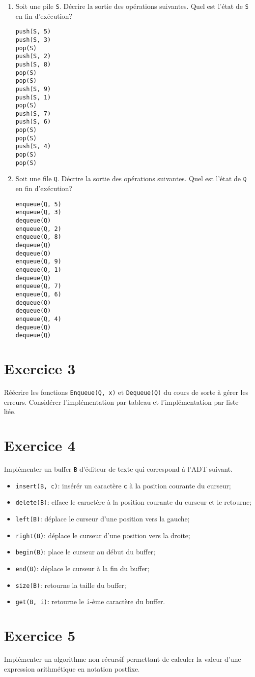 \documentclass[a4paper,10pt]{article}
\begin{document}
\begin{enumerate}
\item Soit une pile \texttt{S}. Décrire la sortie des opérations suivantes. Quel est l'état de \texttt{S} en fin d'exécution?

\begin{verbatim}
push(S, 5)
push(S, 3)
pop(S)
push(S, 2)
push(S, 8)
pop(S)
pop(S)
push(S, 9)
push(S, 1)
pop(S)
push(S, 7)
push(S, 6)
pop(S)
pop(S)
push(S, 4)
pop(S)
pop(S)
\end{verbatim}

\item Soit une file \texttt{Q}. Décrire la sortie des opérations suivantes. Quel est l'état de \texttt{Q} en fin d'exécution?

\begin{verbatim}
enqueue(Q, 5)
enqueue(Q, 3)
dequeue(Q)
enqueue(Q, 2)
enqueue(Q, 8)
dequeue(Q)
dequeue(Q)
enqueue(Q, 9)
enqueue(Q, 1)
dequeue(Q)
enqueue(Q, 7)
enqueue(Q, 6)
dequeue(Q)
dequeue(Q)
enqueue(Q, 4)
dequeue(Q)
dequeue(Q)
\end{verbatim}

\end{enumerate}

\section*{Exercice 3}

Réécrire les fonctions \texttt{Enqueue(Q, x)} et \texttt{Dequeue(Q)} du cours de sorte à gérer les erreurs. Considérer l'implémentation par tableau et l'implémentation par liste liée.

\section*{Exercice 4}

Implémenter un buffer \texttt{B} d'éditeur de texte qui correspond à l'ADT suivant.

\begin{itemize}
\item \texttt{insert(B, c)}: insérér un caractère \texttt{c} à la position courante du curseur;
\item \texttt{delete(B)}: efface le caractère à la position courante du curseur et le retourne;
\item \texttt{left(B)}: déplace le curseur d'une position vers la gauche;
\item \texttt{right(B)}: déplace le curseur d'une position vers la droite;
\item \texttt{begin(B)}: place le curseur au début du buffer;
\item \texttt{end(B)}: déplace le curseur à la fin du buffer;
\item \texttt{size(B)}: retourne la taille du buffer;
\item \texttt{get(B, i)}: retourne le \texttt{i}-ème caractère du buffer.
\end{itemize}

\section*{Exercice 5}

Implémenter un algorithme non-récursif permettant de calculer la valeur d'une expression arithmétique en notation postfixe.
\end{document}
